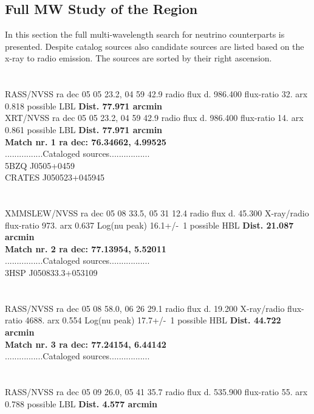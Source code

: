 \documentclass[a4paper]{article}
\begin{document}
\clearpage
\subsection{Full MW Study of the Region}
In this section the full multi-wavelength search for neutrino counterparts is presented. Despite catalog sources also candidate sources are listed based on the x-ray to radio emission. The sources are sorted by their right ascension.
\\ \\ \\
RASS/NVSS ra dec 05 05 23.2, 04 59 42.9 radio flux d.   986.400 flux-ratio     32. arx  0.818                         possible LBL   \textbf{Dist.  77.971 arcmin}\\ 
 XRT/NVSS ra dec 05 05 23.2, 04 59 42.9 radio flux d.   986.400 flux-ratio     14. arx  0.861                         possible LBL   \textbf{Dist.  77.971 arcmin}\\ 
 \textbf{Match nr.   1        ra dec:  76.34662,  4.99525}\\ 
 ................Cataloged sources.................\\ 
 5BZQ J0505+0459               \\ 
 CRATES J050523+045945         \\ 
 \\\\ 
 XMMSLEW/NVSS ra dec 05 08 33.5, 05 31 12.4 radio flux d.   45.300 X-ray/radio flux-ratio    973. arx  0.637 Log(nu peak) 16.1+/-~1   possible HBL  \textbf{Dist.  21.087 arcmin}\\ 
 \textbf{Match nr.   2        ra dec:  77.13954,  5.52011}\\ 
 ................Cataloged sources.................\\ 
 3HSP J050833.3+053109         \\ 
 \\\\ 
 RASS/NVSS ra dec 05 08 58.0, 06 26 29.1 radio flux d.   19.200 X-ray/radio flux-ratio   4688. arx  0.554 Log(nu peak) 17.7+/-~1   possible HBL  \textbf{Dist.  44.722 arcmin}\\ 
 \textbf{Match nr.   3        ra dec:  77.24154,  6.44142}\\ 
 ................Cataloged sources.................\\ 
 \\\\ 
 RASS/NVSS ra dec 05 09 26.0, 05 41 35.7 radio flux d.   535.900 flux-ratio     55. arx  0.788                         possible LBL   \textbf{Dist.   4.577 arcmin}\\ 
\end{document}
